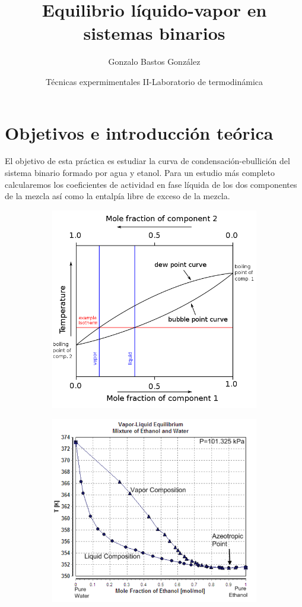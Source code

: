 \documentclass[a4paper,12pt,titlepage]{article}
\title{Equilibrio líquido-vapor en sistemas binarios}
\author{Gonzalo Bastos González}
\date{Técnicas expermimentales II-Laboratorio de termodinámica}
\begin{document}
\maketitle
\tableofcontents

\newpage

\section{Objetivos e introducción teórica}

El objetivo de esta práctica es estudiar la curva de condensación-ebullición del sistema binario formado por agua y etanol. Para un estudio más completo calcularemos los coeficientes de actividad en fase líquida de los dos componentes de la mezcla así como la entalpía libre de exceso de la mezcla.

\begin{figure}[h!]
    \centering
    \begin{subfigure}{0.45\textwidth}
        \centering
        \includegraphics[width=0.85\linewidth]{ELV binario/curva_cond.png}
    \end{subfigure}
    \begin{subfigure}{0.45\textwidth}
        \centering
        \includegraphics[width=0.85\linewidth]{ELV binario/curva_cond2.png}

\end{subfigure}
\end{figure}
\end{document}
